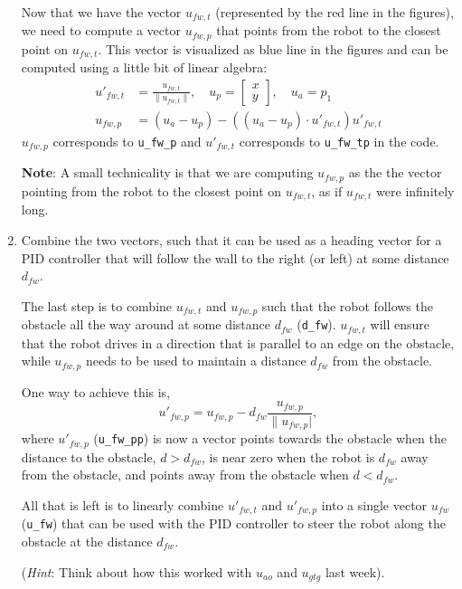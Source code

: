\documentclass[10pt]{article}
\begin{document}
\begin{enumerate}
	Now that we have the vector $u_{fw,t}$ (represented by the red line in the figures), we need to compute a vector $u_{fw,p}$ that points from the robot to the closest point on $u_{fw,t}$. This vector is visualized as blue line in the figures and can be computed using a little bit of linear algebra:
	\begin{equation*}
		\begin{split}
			u'_{fw,t} &= \frac{u_{fw,t}}{\|u_{fw,t}\|}, \quad u_p = \begin{bmatrix} x \\ y \end{bmatrix}, \quad u_a = p_1 \\
			u_{fw,p} &= (u_a-u_p)-((u_a-u_p)\cdot u'_{fw,t})u'_{fw,t}
		\end{split}
	\end{equation*}
	$u_{fw,p}$ corresponds to \texttt{u\_fw\_p} and $u'_{fw,t}$ corresponds to \texttt{u\_fw\_tp} in the code. 
	
	\textbf{Note}: A small technicality is that we are computing $u_{fw,p}$ as the the vector pointing from the robot to the closest point on $u_{fw,t}$, as if $u_{fw,t}$ were infinitely long.
	
	\item Combine the two vectors, such that it can be used as a heading vector for a PID controller that will follow the wall to the right (or left) at some distance $d_{fw}$.
	
	The last step is to combine $u_{fw,t}$ and $u_{fw,p}$ such that the robot follows the obstacle all the way around at some distance $d_{fw}$ (\texttt{d\_fw}). $u_{fw,t}$ will ensure that the robot drives in a direction that is parallel to an edge on the obstacle, while $u_{fw,p}$ needs to be used to maintain a distance $d_{fw}$ from the obstacle.
	
	One way to achieve this is,
	\begin{equation*}
		u'_{fw,p} = u_{fw,p}-d_{fw}\frac{u_{fw,p}}{\|u_{fw,p}|},
	\end{equation*} 
	where $u'_{fw,p}$ (\texttt{u\_fw\_pp}) is now a vector points towards the obstacle when the distance to the obstacle, $d>d_{fw}$, is near zero when the robot is $d_{fw}$ away from the obstacle, and points away from the obstacle when $d<d_{fw}$.
	
	All that is left is to linearly combine $u'_{fw,t}$ and $u'_{fw,p}$ into a single vector $u_{fw}$ (\texttt{u\_fw}) that can be used with the PID controller to steer the robot along the obstacle at the distance $d_{fw}$.
	
	(\textit{Hint}: Think about how this worked with $u_{ao}$ and $u_{gtg}$ last week).	
\end{enumerate}
\end{document}
